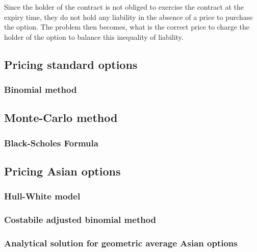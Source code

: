 Since the holder of the contract is not obliged to exercise the contract at the expiry time, they do not hold any liability in the absence of a price to purchase the option. The problem then becomes, what is the correct price to charge the holder of the option to balance this inequality of liability.

\subsection{Pricing standard options}

\subsubsection{Binomial method}

\subsection{Monte-Carlo method}

\subsubsection{Black-Scholes Formula}

\subsection{Pricing Asian options}

\subsubsection{Hull-White model}

\subsubsection{Costabile adjusted binomial method}

\subsubsection{Analytical solution for geometric average Asian options}